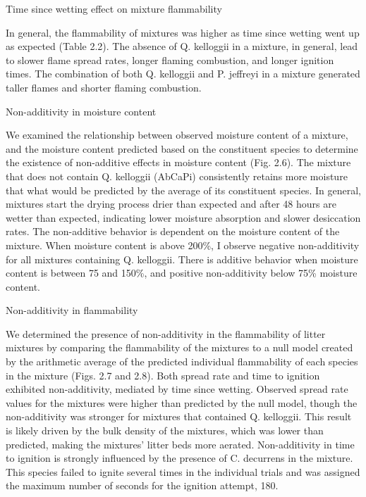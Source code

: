 \documentclass[fire,article,submit,moreauthors,pdftex]{Definitions/mdpi}
\begin{document}
Time since wetting effect on mixture flammability

In general, the flammability of mixtures was higher as time since wetting went up as expected (Table 2.2). The absence of Q. kelloggii in a mixture, in general, lead to slower flame spread rates, longer flaming combustion, and longer ignition times. The combination of both Q. kelloggii and P. jeffreyi in a mixture generated taller flames and shorter flaming combustion.

Non-additivity in moisture content

We examined the relationship between observed moisture content of a mixture, and the moisture content predicted based on the constituent species to determine the existence of non-additive effects in moisture content (Fig. 2.6). The mixture that does not contain Q. kelloggii (AbCaPi) consistently retains more moisture that what would be predicted by the average of its constituent species. In general, mixtures start the drying process drier than expected and after 48 hours are wetter than expected, indicating lower moisture absorption and slower desiccation rates. The non-additive behavior is dependent on the moisture content of the mixture. When moisture content is above 200\%, I observe negative non-additivity for all mixtures containing Q. kelloggii. There is additive behavior when moisture content is between 75 and 150\%, and positive non-additivity below 75\% moisture content.

Non-additivity in flammability

We determined the presence of non-additivity in the flammability of litter mixtures by comparing the flammability of the mixtures to a null model created by the arithmetic average of the predicted individual flammability of each species in the mixture (Figs. 2.7 and 2.8). Both spread rate and time to ignition exhibited non-additivity, mediated by time since wetting. Observed spread rate values for the mixtures were higher than predicted by the null model, though the non-additivity was stronger for mixtures that contained Q. kelloggii. This result is likely driven by the bulk density of the mixtures, which was lower than predicted, making the mixtures’ litter beds more aerated. Non-additivity in time to ignition is strongly influenced by the presence of C. decurrens in the mixture. This species failed to ignite several times in the individual trials and was assigned the maximum number of seconds for the ignition attempt, 180.
\end{document}
